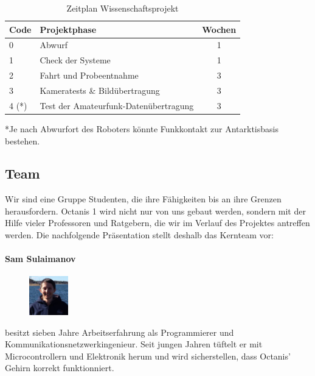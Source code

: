 \documentclass[a4paper,12pt]{article}
\begin{document}
\begin{table}[h!]
\centering
\begin{tabular}{ l | l | c }
\bfseries{Code} & \bfseries{Projektphase} & \bfseries{Wochen} \\
\hline

0 & Abwurf & 1 \\
1 & Check der Systeme & 1 \\
2 & Fahrt und Probeentnahme & 3 \\
3 & Kameratests \& Bildübertragung & 3 \\
4 (*)& Test der Amateurfunk-Datenübertragung  & 3 \\

\end{tabular}
\caption{Zeitplan Wissenschaftsprojekt}

*Je nach Abwurfort des Roboters könnte Funkkontakt zur Antarktisbasis bestehen. 

\end{table}

\pagebreak

\subsection{Team}

Wir sind eine Gruppe Studenten, die ihre Fähigkeiten bis an ihre Grenzen herausfordern. Octanis 1 wird nicht nur von uns gebaut werden, sondern mit der Hilfe vieler Professoren und Ratgebern, die wir im Verlauf des Projektes antreffen werden. Die nachfolgende Präsentation stellt deshalb das Kernteam vor:




\paragraph{Sam Sulaimanov} 
\begin{figure}
    \centering
    \vspace{-13pt}
    \includegraphics[width=0.15\textwidth]{sam}
\end{figure} besitzt sieben Jahre Arbeitserfahrung als Programmierer und Kommunikationsnetzwerkingenieur. Seit jungen Jahren tüftelt er mit Microcontrollern und Elektronik herum und wird sicherstellen, dass Octanis' Gehirn korrekt funktionniert.
\\ \\
\end{document}
